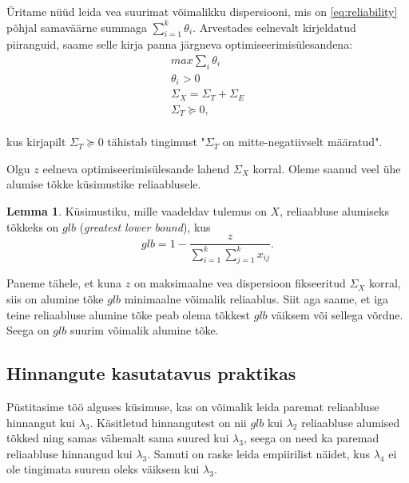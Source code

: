 \documentclass[a4paper,12pt,oneside]{article}
\newcounter{lemma}[section]
\numberwithin{equation}{section}
\theoremstyle{definition}
\newtheorem{glb}[lemma]{Lemma}
\begin{document}
 
\"Uritame n\"u\"ud  leida vea suurimat võimalikku dispersiooni, mis on \eqref{eq:reliability} põhjal samaväärne summaga $\sum \limits_{i=1}^k \theta_i$. Arvestades eelnevalt kirjeldatud piiranguid, saame selle  kirja panna järgneva optimiseerimis\"ulesandena:
\begin{equation}
\begin{gathered}
max \sum_i \theta_i \\
\theta_i > 0 \\
\Sigma_X = \Sigma_T + \Sigma_E \\
\Sigma_T \succeq 0, \\
\end{gathered} 
\end{equation} 

kus kirjapilt $\Sigma_T \succeq 0$ tähistab tingimust "$\Sigma_T$ on mitte-negatiivselt määratud". 

Olgu $z$ eelneva optimiseerimis\"ulesande lahend $\Sigma_X$ korral. Oleme saanud veel ühe alumise tõkke küsimustike reliaablusele.

\begin{glb}
Küsimustiku, mille vaadeldav tulemus on $X$, reliaabluse alumiseks tõkkeks on $glb$ (\textit{greatest lower bound}), kus 
\begin{equation*}
glb = 1 - \frac{z}{\sum \limits_{i=1}^k \sum \limits_{j=1}^k x_{ij}} \text{.}
\end{equation*}  
\end{glb}

Paneme tähele, et kuna $z$ on maksimaalne vea dispersioon fikseeritud $\Sigma_X$ korral, siis on alumine tõke $glb$ minimaalne võimalik reliaablus. Siit aga saame, et iga teine reliaabluse alumine tõke peab olema tõkkest $glb$ väiksem või sellega võrdne. Seega on $glb$ suurim võimalik alumine tõke. 

\subsection{Hinnangute kasutatavus praktikas}

Püstitasime töö alguses küsimuse, kas on võimalik leida paremat reliaabluse hinnangut kui $\lambda_3$. Käsitletud hinnangutest on nii $glb$ kui $\lambda_2$ reliaabluse alumised tõkked ning samas vähemalt sama suured kui $\lambda_3$, seega on need ka paremad reliaabluse hinnangud kui $\lambda_3$. Samuti on raske leida empiirilist näidet, kus  $\lambda_4$ ei ole tingimata suurem oleks väiksem kui $\lambda_3$.
\end{document}
